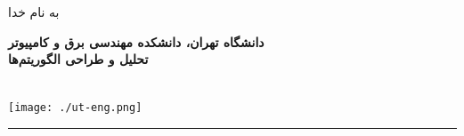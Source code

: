 \documentclass{article}
\date{}
\date{}
\def\vstrut#1{\rule{0pt}{#1}}
\def\nothing{\vstrut{0pt}}
\begin{document}
\begin{center}
{به نام خدا}
\end{center}

\hspace{8mm}

{\noindent \Large \textbf {
دانشگاه تهران، دانشکده مهندسی برق و کامپیوتر \\
تحلیل و طراحی الگوریتم‌ها \\
}}

{}

\begin{flushleft}
\nothing \\[-3.2cm]
\texttt{[image: ./ut-eng.png]}
\end{flushleft}

\rule{\textwidth}{1pt}
\end{document}

